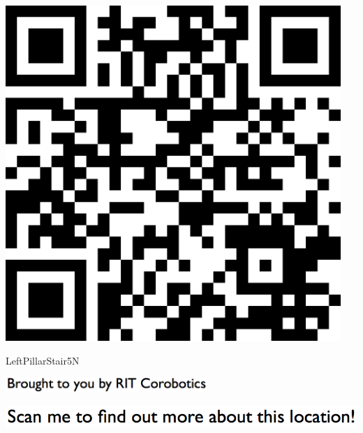 \documentclass[letterpaper]{article}
\begin{document}
 \begingroup 
 \centerline{\includegraphics[scale=1,width=5in,height=5in]{LeftPillarStair5N.png}} 
 \endgroup 
 \vspace*{\fill} 

 \hfill{\small LeftPillarStair5N} 

  \vspace{0.7in} 
 
 \centerline{\includegraphics[scale=1,width=3in]{text-bottom.png}} 
 
 \pagebreak 
{} 
 \vspace*{\fill} 
 
  \centerline{\includegraphics[scale=1,width=6in]{text-top.png}} 
 
 \vspace{0.5in} 
 
\end{document}
